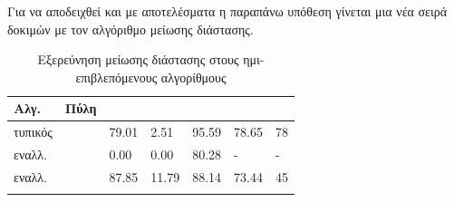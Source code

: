 Για να αποδειχθεί και με αποτελέσματα η παραπάνω υπόθεση γίνεται μια νέα σειρά δοκιμών με τον αλγόριθμο μείωσης διάστασης.
\begin{center}
\begin{longtabu} to 0.8\textwidth { |X[c] | X[c] || X[c] | X[c] | X[c] | X[c] | X[c] |  }
 \hline
 Αλγ.& Πύλη &  &  &  &  & \\
\hline
τυπικός& & 79.01 & 2.51 & 95.59 & 78.65 & 78\\
 \hline
 εναλλ.& & 0.00 & 0.00  & 80.28 &  - &  -\\ 
\hline
εναλλ.& & 87.85 & 11.79  & 88.14 & 73.44 & 45\\ 
 \hline
\caption{Εξερεύνηση μείωσης διάστασης στους ημι-επιβλεπόμενους αλγορίθμους}
\label{tab:testpcasemisup}
\end{longtabu}
\end{center}
